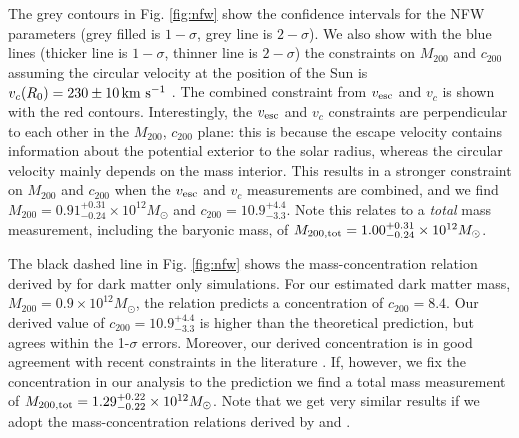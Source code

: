 \documentclass[fleqn,usenatbib]{mnras}
\newcommand{\kms}        {\,{\rm km}\,\,{\rm s}^{-1}}
\begin{document}
The grey contours in Fig. \ref{fig:nfw} show the confidence intervals for the NFW parameters (grey filled is $1-\sigma$, grey line is $2-\sigma$). We also show with the blue lines (thicker line is $1-\sigma$, thinner line is $2-\sigma$) the constraints on $M_{200}$ and $c_{200}$ assuming the circular velocity at the position of the Sun is $v_c(R_0) = 230 \pm 10 \kms$ \citep{eilers18}. The combined constraint from $v_{\rm esc}$ and $v_c$ is shown with the red contours. Interestingly, the $v_{\rm esc}$ and $v_c$ constraints are perpendicular to each other in the $M_{200}$, $c_{200}$ plane: this is because the escape velocity contains information about the potential exterior to the solar radius, whereas the circular velocity mainly depends on the mass interior.  This results in a stronger constraint on $M_{200}$ and $c_{200}$ when the $v_{\rm esc}$ and $v_c$ measurements are combined, and we find $M_{200} = 0.91^{+0.31}_{-0.24} \times 10^{12}M_\odot$ and $c_{200} = 10.9^{+4.4}_{-3.3}$. Note this relates to a \emph{total} mass measurement, including the baryonic mass, of $M_{200, \rm tot}= 1.00^{+0.31}_{-0.24} \times 10^{12}M_\odot$.

The black dashed line in Fig. \ref{fig:nfw} shows the mass-concentration relation derived by \cite{dutton14} for dark matter only simulations. For our estimated dark matter mass, $M_{200} = 0.9 \times 10^{12}M_\odot$, the \cite{dutton14} relation predicts a concentration of $c_{200}=8.4$. Our derived value of $c_{200} = 10.9^{+4.4}_{-3.3}$ is higher than the theoretical prediction, but agrees within the 1-$\sigma$ errors. Moreover, our derived concentration is in good agreement with recent constraints in the literature \citep[e.g.][]{callingham19}. If, however, we fix the concentration in our analysis to the \cite{dutton14} prediction we find a total mass measurement of $M_{200, \rm tot}= 1.29^{+0.22}_{-0.22} \times 10^{12}M_\odot$. Note that we get very similar results if we adopt the mass-concentration relations derived by \cite{schaller15} and \cite{ludlow16}.
\end{document}
